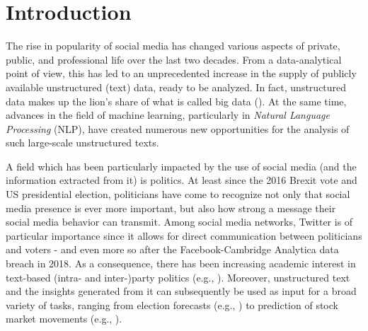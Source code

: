 \section{Introduction}
\label{Introduction}

The rise in popularity of social media has changed various aspects of private, public, and professional life over the last two decades. From a data-analytical point of view, this has led to an unprecedented increase in the supply of publicly available unstructured (text) data, ready to be analyzed. In fact, unstructured data makes up the lion's share of what is called big data (\citealp{gandomi2015beyond}). At the same time, advances in the field of machine learning, particularly in \textit{Natural Language Processing} (NLP), have created numerous new opportunities for the analysis of such large-scale unstructured texts.

A field which has been particularly impacted by the use of social media (and the information extracted from it) is politics. At least since the 2016 Brexit vote and US presidential election, politicians have come to recognize not only that social media presence is ever more important, but also how strong a message their social media behavior can transmit. Among social media networks, Twitter is of particular importance since it allows for direct communication between politicians and voters - and even more so after the Facebook-Cambridge Analytica data breach in 2018. As a consequence, there has been increasing academic interest in text-based (intra- and inter-)party politics (e.g., \citealp{ceron2017intra, daniel2019static, grimmer2010bayesian, quinlan2018show}). Moreover, unstructured text and the insights generated from it can subsequently be used as input for a broad variety of tasks, ranging from election forecasts (e.g., \citealp{burnap2016140, jungherr2016twitter, tumasjan2010predicting}) to prediction of stock market movements (e.g., \citealp{nisar2018twitter}).

